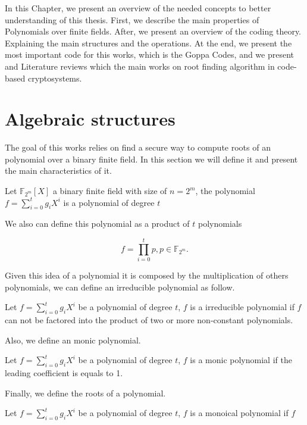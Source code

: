 In this Chapter, we present an overview of the needed concepts to better understanding of this thesis. First, we describe the main properties of Polynomials over finite fields. After, we present an overview of the coding theory. Explaining the main structures and the operations. At the end, we present the most important code for this works, which is the Goppa Codes, and we present and Literature reviews which the main works on root finding algorithm in code-based cryptosystems. 

\section{Algebraic structures}
The goal of this works relies on find a secure way to compute roots of an polynomial over a binary finite field. In this section we will define it and present the main characteristics of it.

\begin{definition}
Let $\mathbb{F}_{2^m}[X]$ a binary finite field with size of $n=2^m$, the polynomial $f = \sum_{i=0}^{t}{g_{i}X^{i}}$ is a polynomial of degree $t$
\end{definition}


We also can define this polynomial as a product of $t$ polynomials

\begin{equation*}
    f = \prod_{i=0}^{t}{p}, p \in \mathbb{F}_{2^m}.
\end{equation*}

Given this idea of a polynomial it is composed by the multiplication of others polynomials, we can define an irreducible polynomial as follow.

\begin{definition}
Let $f = \sum_{i=0}^{t}{g_{i}X^{i}}$ be a polynomial of degree $t$, $f$ is a irreducible polynomial if $f$ can not be factored into the product of two or more non-constant polynomials.
\end{definition}

Also, we define an monic polynomial.
\begin{definition}
Let $f = \sum_{i=0}^{t}{g_{i}X^{i}}$ be a polynomial of degree $t$, $f$ is a monic polynomial if the leading coefficient is equals to 1. 
\end{definition}

Finally, we define the roots of a polynomial.
\begin{definition}
Let $f = \sum_{i=0}^{t}{g_{i}X^{i}}$ be a polynomial of degree $t$, $f$ is a monoical polynomial if $f$ 
\end{definition}

